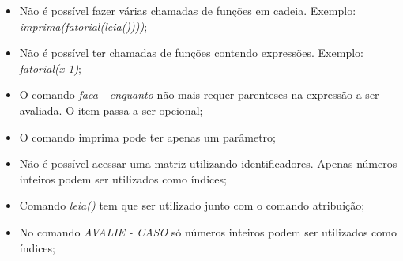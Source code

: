\documentclass[
12pt,				%
a4paper,			%
english,			%
french,				%
spanish,			%
brazil,				%
article
]{abntex2}
\begin{document}
\begin{itemize}
	\item Não é possível fazer várias chamadas de funções em cadeia. Exemplo: \textit{imprima(fatorial(leia())))};
	\item Não é possível ter chamadas de funções contendo expressões. Exemplo: \textit{fatorial(x-1)};
	\item O comando \textit{faca - enquanto} não mais requer parenteses na expressão a ser avaliada. O item passa a ser opcional;
	\item O comando imprima pode ter apenas um parâmetro;
	\item Não é possível acessar uma matriz utilizando identificadores. Apenas números inteiros podem ser utilizados como índices;
	\item Comando \textit{leia()} tem que ser utilizado junto com o comando atribuição;
	\item No comando \textit{AVALIE - CASO} só números inteiros podem ser utilizados como índices;
\end{itemize}
\end{document}
